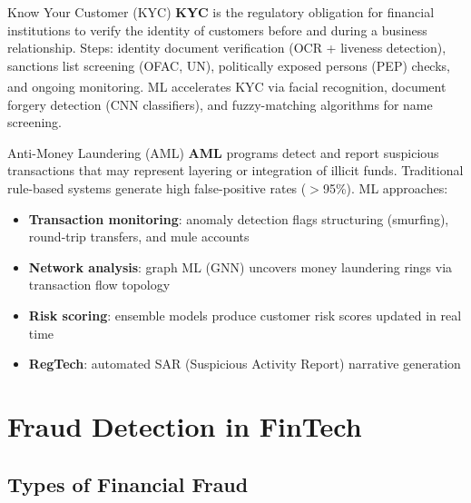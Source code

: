 \begin{v3topic}{Know Your Customer (KYC)}
    \textbf{KYC} is the regulatory obligation for financial institutions to verify the identity of customers before and during a business relationship.
    Steps: identity document verification (OCR + liveness detection), sanctions list screening (OFAC, UN), politically exposed persons (PEP) checks, and ongoing monitoring\textsuperscript{\cite[][pp.~378--379]{kardellBuildFinancialSoftware2025}}.
    ML accelerates KYC via facial recognition, document forgery detection (CNN classifiers), and fuzzy-matching algorithms for name screening.

\end{v3topic}
\begin{v3topic}{Anti-Money Laundering (AML)}
    \textbf{AML} programs detect and report suspicious transactions that may represent layering or integration of illicit funds.
    Traditional rule-based systems generate high false-positive rates ($>$95\%).
    ML approaches:
\visualseparator
    \begin{itemize}
        \item \textbf{Transaction monitoring}: anomaly detection flags structuring (smurfing), round-trip transfers, and mule accounts
        \item \textbf{Network analysis}: graph ML (GNN) uncovers money laundering rings via transaction flow topology
        \item \textbf{Risk scoring}: ensemble models produce customer risk scores updated in real time
        \item \textbf{RegTech}: automated SAR (Suspicious Activity Report) narrative generation
    \end{itemize}

\end{v3topic}

\section{Fraud Detection in FinTech}

\subsection{Types of Financial Fraud}


